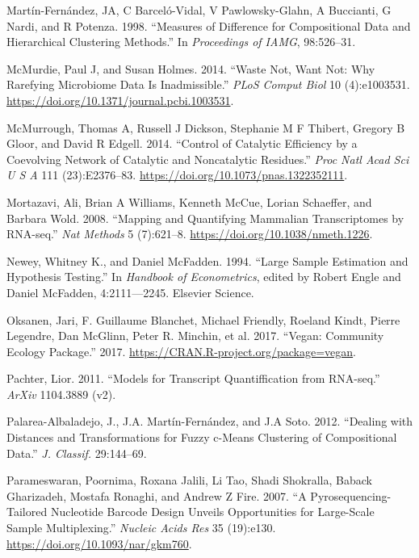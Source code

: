 \documentclass[onecolumn]{book}
\theoremstyle{definition}
\theoremstyle{definition}
\theoremstyle{definition}
\theoremstyle{remark}
\begin{document}
\leavevmode\hypertarget{ref-martin1998measures}{}%
Martín-Fernández, JA, C Barceló-Vidal, V Pawlowsky-Glahn, A Buccianti, G
Nardi, and R Potenza. 1998. ``Measures of Difference for Compositional
Data and Hierarchical Clustering Methods.'' In \emph{Proceedings of
IAMG}, 98:526--31.

\leavevmode\hypertarget{ref-McMurdie:2014a}{}%
McMurdie, Paul J, and Susan Holmes. 2014. ``Waste Not, Want Not: Why
Rarefying Microbiome Data Is Inadmissible.'' \emph{PLoS Comput Biol} 10
(4):e1003531. \url{https://doi.org/10.1371/journal.pcbi.1003531}.

\leavevmode\hypertarget{ref-mcmurrough:2014}{}%
McMurrough, Thomas A, Russell J Dickson, Stephanie M F Thibert, Gregory
B Gloor, and David R Edgell. 2014. ``Control of Catalytic Efficiency by
a Coevolving Network of Catalytic and Noncatalytic Residues.''
\emph{Proc Natl Acad Sci U S A} 111 (23):E2376--83.
\url{https://doi.org/10.1073/pnas.1322352111}.

\leavevmode\hypertarget{ref-Mortazavi:2008}{}%
Mortazavi, Ali, Brian A Williams, Kenneth McCue, Lorian Schaeffer, and
Barbara Wold. 2008. ``Mapping and Quantifying Mammalian Transcriptomes
by RNA-seq.'' \emph{Nat Methods} 5 (7):621--8.
\url{https://doi.org/10.1038/nmeth.1226}.

\leavevmode\hypertarget{ref-Newey:1994}{}%
Newey, Whitney K., and Daniel McFadden. 1994. ``Large Sample Estimation
and Hypothesis Testing.'' In \emph{Handbook of Econometrics}, edited by
Robert Engle and Daniel McFadden, 4:2111---2245. Elsevier Science.

\leavevmode\hypertarget{ref-vegan:2017}{}%
Oksanen, Jari, F. Guillaume Blanchet, Michael Friendly, Roeland Kindt,
Pierre Legendre, Dan McGlinn, Peter R. Minchin, et al. 2017. ``Vegan:
Community Ecology Package.'' 2017.
\url{https://CRAN.R-project.org/package=vegan}.

\leavevmode\hypertarget{ref-Pachter:2011}{}%
Pachter, Lior. 2011. ``Models for Transcript Quantiffication from
RNA-seq.'' \emph{ArXiv} 1104.3889 (v2).

\leavevmode\hypertarget{ref-fernandez:2012}{}%
Palarea-Albaladejo, J., J.A. Martín-Fernández, and J.A Soto. 2012.
``Dealing with Distances and Transformations for Fuzzy c-Means
Clustering of Compositional Data.'' \emph{J. Classif.} 29:144--69.

\leavevmode\hypertarget{ref-Parameswaran:2007aa}{}%
Parameswaran, Poornima, Roxana Jalili, Li Tao, Shadi Shokralla, Baback
Gharizadeh, Mostafa Ronaghi, and Andrew Z Fire. 2007. ``A
Pyrosequencing-Tailored Nucleotide Barcode Design Unveils Opportunities
for Large-Scale Sample Multiplexing.'' \emph{Nucleic Acids Res} 35
(19):e130. \url{https://doi.org/10.1093/nar/gkm760}.
\end{document}
